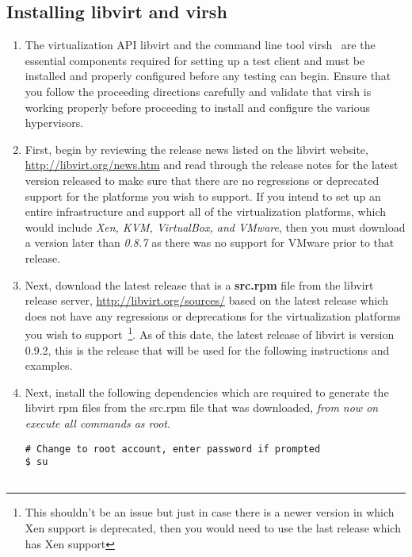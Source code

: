 \newpage
\subsection{Installing libvirt and virsh}
\label{sec:rhvirsh}
\begin{enumerate}
\item	The virtualization API libvirt and the command line tool virsh~\cite{libvirt} are the essential components required 
		for setting up a test client and must be installed and properly configured before any testing can begin. Ensure that
		you follow the proceeding directions carefully and validate that virsh is working properly before proceeding to 
		install and configure the various hypervisors.
		
\item	First, begin by reviewing the release news listed on the libvirt website, \url{http://libvirt.org/news.htm} and read 
		through the release notes for the latest version released to make sure that there are no regressions or deprecated 
		support for the platforms you wish to support. If you intend to set up an entire infrastructure and support all of the
		\cernvm virtualization platforms, which would include \emph{Xen, KVM, VirtualBox, and VMware}, then you must download
		a version later than \emph{0.8.7} as there was no support for VMware prior to that release.

\item	Next, download the latest release that is a {\bf src.rpm} file from the libvirt release server, 
		\url{http://libvirt.org/sources/} based on the latest release which does not have any regressions or deprecations for
		the virtualization platforms you wish to support~\footnote{This shouldn't be an issue but just in case there is a 
		newer version in which Xen support is deprecated, then you would need to use the last release which has Xen support}.
		As of this date, the latest release of libvirt is version 0.9.2, this is the release that will be used for the
		following instructions and examples.
		
\item	Next, install the following dependencies which are required to generate the libvirt rpm files from the src.rpm file
		that was downloaded, \emph{from now on execute all commands as root}.
		
\lstset{language=bash,caption=Install src.rpm Dependencies}
\begin{lstlisting}
# Change to root account, enter password if prompted
$ su


\end{lstlisting}
\end{enumerate}
